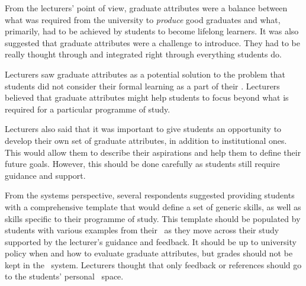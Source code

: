 From the lecturers' point of view, graduate attributes were a balance between
what was required from the university to \textit{produce} good graduates and
what, primarily, had to be achieved by students to become lifelong learners. It
was also suggested that graduate attributes were a challenge to introduce. They
had to be really thought through and integrated right through everything
students do.


Lecturers saw graduate attributes as a potential solution to the problem that
students did not consider their formal learning as a part of their \LLLsn.
Lecturers believed that graduate attributes might help students to focus beyond
what is required for a particular programme of study.

Lecturers also said that it was important to give students an opportunity to
develop their own set of graduate attributes, in addition to institutional ones.
This would allow them to describe their aspirations and help them to define
their future goals. However, this should be done carefully as students still
require guidance and support.


From the systems perspective, several respondents suggested providing students
with a comprehensive template that would define a set of generic \LLLs skills,
as well as skills specific to their programme of study. This template should be
populated by students with various examples from their \ep~as they move across
their study supported by the lecturer's guidance and feedback. It should be up
to university policy when and how to evaluate graduate attributes, but grades
should not be kept in the \ep~system. Lecturers thought that only feedback or
references should go to the students' personal \ep~space.

